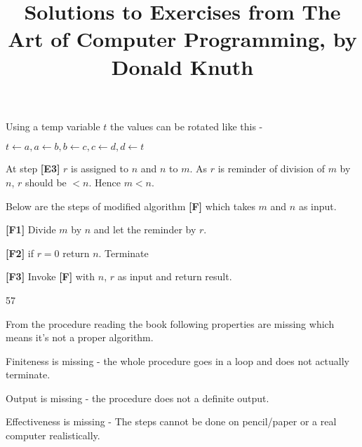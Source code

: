 \documentclass[24pt]{article}
\title{Solutions to Exercises from The Art of Computer Programming, by Donald Knuth}
\begin{document}
\maketitle

\begin{enumerate}
\begin{item}
Using a temp variable $t$ the values can be rotated like this -

$ t \leftarrow a, a \leftarrow b, b \leftarrow c, c \leftarrow d, d \leftarrow t $ 
\end{item}


\begin{item}
  At step {\bf[E3]} $r$ is assigned to $n$ and $n$ to $m$. As $r$ is reminder of division of $m$ by $n$, $r$ should be $< n$. Hence $m < n$. 
\end{item}

\begin{item}

  Below are the steps of modified algorithm {\bf[F]} which takes $m$ and $n$ as input.
  
  {\bf[F1]} Divide $m$ by $n$ and let the reminder by $r$.

  {\bf[F2]} if $r = 0$ return $n$. Terminate

  {\bf[F3]} Invoke {\bf[F]} with $n$, $r$ as input and return result.
\end{item}


\begin{item}

  57
  
\end{item}


\begin{item}

  From the procedure reading the book following properties are missing which means it's not a proper algorithm.
  \begin{itemize}
    \begin{item}
      Finiteness is missing - the whole procedure goes in a loop and does not actually terminate.
    \end{item}

    \begin{item}
      Output is missing - the procedure does not a definite output.
    \end{item}

    \begin{item}
      Effectiveness is missing - The steps cannot be done on pencil/paper or a real computer realistically.
    \end {item}


\end{itemize}
\end{item}
\end{enumerate}
\end{document}
